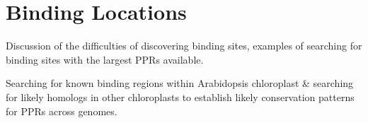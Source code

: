 \section{Binding Locations}

Discussion of the difficulties of discovering binding sites, examples of
searching for binding sites with the largest PPRs available.

Searching for known binding regions within Arabidopsis chloroplast \& searching
for likely homologs in other chloroplasts to establish likely conservation
patterns for PPRs across genomes. 


